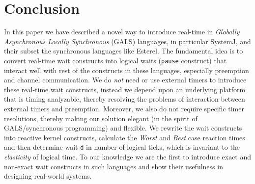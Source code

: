 \section{Conclusion}
\label{sec:concl-future-work}

In this paper we have described a novel way to introduce real-time in
\textit{Globally Asynchronous Locally Synchronous} (GALS) languages, in
particular SystemJ, and their subset the synchronous languages like
Esterel. The fundamental idea is to convert real-time wait constructs
into logical waits (\texttt{pause} construct) that interact well with
rest of the constructs in these languages, especially preemption and
channel communication. We do \textit{not} need or use external timers to
introduce these real-time wait constructs, instead we depend upon an
underlying platform that is timing analyzable, thereby resolving the
problems of interaction between external timers and
preemption. Moreover, we also do not require specific timer resolutions,
thereby making our solution elegant (in the spirit of GALS/synchronous
programming) and flexible. We rewrite the wait constructs into reactive
kernel constructs, calculate the \textit{Worst} and \textit{Best} case
reaction times and then determine wait \texttt{d} in number of logical
ticks, which is invariant to the \textit{elasticity} of logical time. To
our knowledge we are the first to introduce exact and non-exact wait
constructs in such languages and show their usefulness in designing
real-world systems.


